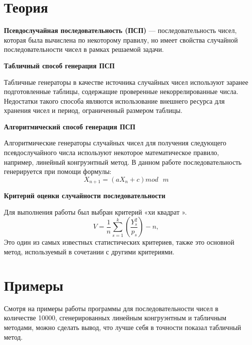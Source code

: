 \documentclass[14pt, a4paper]{extarticle}
\begin{document}
	\clearpage
	\section*{Теория}
	
	\textbf{Псевдослучайная последовательность (ПСП)} — последовательность
	чисел, которая была вычислена по некоторому правилу, но имеет свойства
	случайной последовательности чисел в рамках решаемой задачи.\par
	
	\textbf{Табличный способ генерация ПСП}\par
	Табличные генераторы в качестве источника случайных чисел используют заранее подготовленные таблицы, содержащие проверенные некоррелированные числа. Недостатки такого способа являются использование внешнего ресурса для хранения чисел и период, ограниченный размером таблицы.\par
	
	\textbf{Алгоритмический способ генерация ПСП}\par
	Алгоритмические генераторы случайных чисел для получения следующего псевдослучайного числа используют некоторое математическое правило, например, линейный конгруэнтный метод. В данном работе последовательность генерируется при помощи формулы: 
	\begin{equation}
		X_{n+1} = (aX_n + c) mod \text{ }m
	\end{equation}
	

	\textbf{Критерий оценки случайности последовательности}\par
	Для выполнения работы был выбран критерий «хи квадрат ».
	\begin{equation*}
		V = \frac{1}{n} \sum_{s=1}^{k}(\frac{Y_s^2}{p_s}) - n,
	\end{equation*}
	 Это один из
	самых известных статистических критериев, также это основной метод,
	используемый в сочетании с другими критериями. 

	\clearpage
	\section*{Примеры}
	Смотря на примеры работы программы для последовательности чисел в количестве 10000, сгенерированных линейным
	конгруэнтным и табличным методами, можно сделать вывод, что лучше себя в точности показал табличный метод.
	
\end{document}
